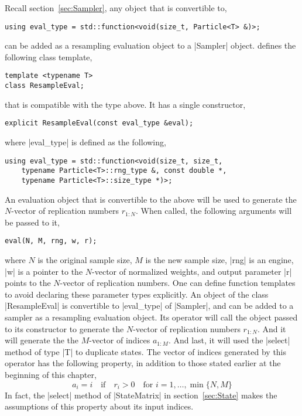 Recall section~\ref{sec:Sampler}, any object that is convertible to,
\begin{verbatim}
using eval_type = std::function<void(size_t, Particle<T> &)>;
\end{verbatim}
can be added as a resampling evaluation object to a |Sampler| object. \mckl
defines the following class template,
\begin{verbatim}
template <typename T>
class ResampleEval;
\end{verbatim}
that is compatible with the type above. It has a single constructor,
\begin{verbatim}
explicit ResampleEval(const eval_type &eval);
\end{verbatim}
where |eval_type| is defined as the following,
\begin{verbatim}
using eval_type = std::function<void(size_t, size_t,
    typename Particle<T>::rng_type &, const double *,
    typename Particle<T>::size_type *)>;
\end{verbatim}
An evaluation object that is convertible to the above will be used to generate
the $N$-vector of replication numbers $r_{1:N}$. When called, the following
arguments will be passed to it,
\begin{verbatim}
eval(N, M, rng, w, r);
\end{verbatim}
where $N$ is the original sample size, $M$ is the new sample size, |rng| is an
\rng engine, |w| is a pointer to the $N$-vector of normalized weights, and
output parameter |r| points to the $N$-vector of replication numbers. One can
define function templates to avoid declaring these parameter types explicitly.
An object of the class |ResampleEval| is convertible to |eval_type| of
|Sampler|, and can be added to a sampler as a resampling evaluation object. Its
operator will call the object passed to its constructor to generate the
$N$-vector of replication numbers $r_{1:N}$. And it will generate the the
$M$-vector of indices $a_{1:M}$. And last, it will used the |select| method of
type |T| to duplicate states. The vector of indices generated by this operator
has the following property, in addition to those stated earlier at the
beginning of this chapter,
\begin{equation*}
  a_i = i \quad \text{if} \quad  r_i > 0 \quad
  \text{for } i = 1,\dots,\min\{N, M\}
\end{equation*}
In fact, the |select| method of |StateMatrix| in section~\ref{sec:State} makes
the assumptions of this property about its input indices.


